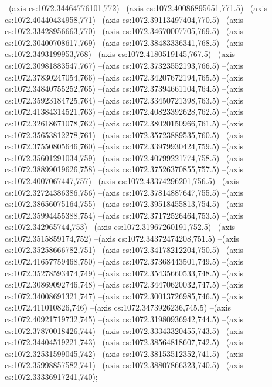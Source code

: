 --(axis cs:1072.34464776101,772)
--(axis cs:1072.40086895651,771.5)
--(axis cs:1072.40440434958,771)
--(axis cs:1072.39113497404,770.5)
--(axis cs:1072.33428956663,770)
--(axis cs:1072.34670007705,769.5)
--(axis cs:1072.30400708617,769)
--(axis cs:1072.38483336341,768.5)
--(axis cs:1072.3493199953,768)
--(axis cs:1072.4180519145,767.5)
--(axis cs:1072.30981883547,767)
--(axis cs:1072.37323552193,766.5)
--(axis cs:1072.37830247054,766)
--(axis cs:1072.34207672194,765.5)
--(axis cs:1072.34840755252,765)
--(axis cs:1072.37394661104,764.5)
--(axis cs:1072.35923184725,764)
--(axis cs:1072.33450721398,763.5)
--(axis cs:1072.41384314521,763)
--(axis cs:1072.40823392628,762.5)
--(axis cs:1072.32618671078,762)
--(axis cs:1072.38020150966,761.5)
--(axis cs:1072.35653812278,761)
--(axis cs:1072.35723889535,760.5)
--(axis cs:1072.37550805646,760)
--(axis cs:1072.33979930424,759.5)
--(axis cs:1072.35601291034,759)
--(axis cs:1072.40799221774,758.5)
--(axis cs:1072.38899019626,758)
--(axis cs:1072.37526370855,757.5)
--(axis cs:1072.4007067447,757)
--(axis cs:1072.43374296201,756.5)
--(axis cs:1072.32724386386,756)
--(axis cs:1072.37814887647,755.5)
--(axis cs:1072.38656075164,755)
--(axis cs:1072.39518455813,754.5)
--(axis cs:1072.35994455388,754)
--(axis cs:1072.37172526464,753.5)
--(axis cs:1072.342965744,753)
--(axis cs:1072.31967260191,752.5)
--(axis cs:1072.3515859174,752)
--(axis cs:1072.34372474208,751.5)
--(axis cs:1072.35258666782,751)
--(axis cs:1072.34178212204,750.5)
--(axis cs:1072.41657759468,750)
--(axis cs:1072.37368443501,749.5)
--(axis cs:1072.35278593474,749)
--(axis cs:1072.35435660533,748.5)
--(axis cs:1072.30869092746,748)
--(axis cs:1072.34470620032,747.5)
--(axis cs:1072.34008691321,747)
--(axis cs:1072.30013726985,746.5)
--(axis cs:1072.411010826,746)
--(axis cs:1072.3473926236,745.5)
--(axis cs:1072.40921719732,745)
--(axis cs:1072.31980936942,744.5)
--(axis cs:1072.37870018426,744)
--(axis cs:1072.33343320455,743.5)
--(axis cs:1072.34404519221,743)
--(axis cs:1072.38564818607,742.5)
--(axis cs:1072.32531599045,742)
--(axis cs:1072.38153512352,741.5)
--(axis cs:1072.35998857582,741)
--(axis cs:1072.38807866323,740.5)
--(axis cs:1072.33336917241,740);

